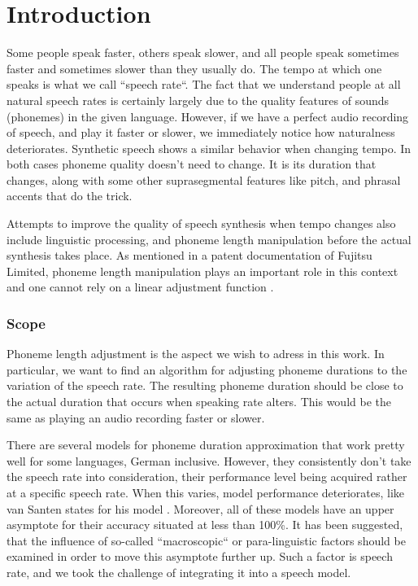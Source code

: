 \documentclass[11pt,a4paper]{scrbook}
\begin{document}
\mainmatter

\chapter{Introduction}
Some people speak faster, others speak slower, and all people speak sometimes faster and sometimes slower than they usually do. The tempo at which one speaks is what we call ``speech rate``. The fact that we understand people at all natural speech rates is certainly largely due to the quality features of sounds (phonemes) in the given language. However, if we have a perfect audio recording of speech, and play it faster or slower, we immediately notice how naturalness deteriorates. Synthetic speech shows a similar behavior when changing tempo. In both cases phoneme quality doesn't need to change. It is its duration that changes, along with some other suprasegmental features like pitch, and phrasal accents that do the trick. 

Attempts to improve the quality of speech synthesis when tempo changes also include linguistic processing, and phoneme length manipulation before the actual synthesis takes place. As mentioned in a patent documentation of Fujitsu Limited, phoneme length manipulation plays an important role in this context and one cannot rely on a linear adjustment function \cite{nishiike2008}. 

\subsection*{Scope}
Phoneme length adjustment is the aspect we wish to adress in this work. In particular, we want to find an algorithm for adjusting phoneme durations to the variation of the speech rate. The resulting phoneme duration should be close to the actual duration that occurs when speaking rate alters. This would be the same as playing an audio recording faster or slower. 

There are several models for phoneme duration approximation that work pretty well for some languages, German inclusive. However, they consistently don't take the speech rate into consideration, their performance level being acquired rather at a specific speech rate. When this varies, model performance deteriorates, like van Santen states for his model \cite{Santen1994}. Moreover, all of these models have an upper asymptote for their accuracy situated at less than 100\%. It has been suggested, that the influence of so-called ``macroscopic`` or para-linguistic \cite{Santen1994} factors should be examined in order to move this asymptote further up. Such a factor is speech rate, and we took the challenge of integrating it into a speech model. 
\end{document}
